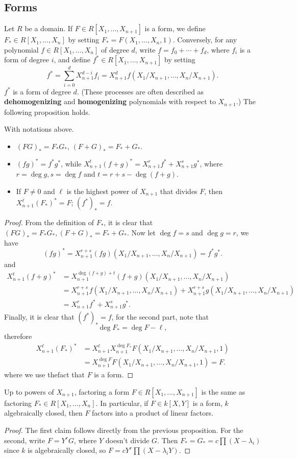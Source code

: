 \subsection{Forms}
Let $R$ be a domain. If $F\in R[X_1,\dots,X_{n+1}]$ is a form, we define $F_*\in R[X_1,\dots,X_{n}]$ by setting $F_*=F(X_1,\dots,X_n,1)$. Conversely, for any polynomial $f\in R[X_1,\dots,X_n]$ of degree $d$, write $f=f_0+\cdots+f_d$, where $f_i$ is a form of degree $i$, and define $f^*\in R[X_1,\dots,X_{n+1}]$ by setting
\[f^*=\sum_{i=0}^{d}X_{n+1}^{d-i}f_{i}=X_{n+1}^df(X_1/X_{n+1},\dots,X_n/X_{n+1}).\]
$f^*$ is a form of degree $d$. (These processes are often described as \textbf{dehomogenizing} and \textbf{homogenizing} polynomials with respect to $X_{n+1}$.) The following proposition holds.
\begin{proposition}\label{homogenousing}
With notations above.
\begin{itemize}
\item $(FG)_*=F_*G_*$, $(F+G)_*=F_*+G_*$.
\item $(fg)^*=f^*g^*$, while $X_{n+1}^t(f+g)^*=X_{n+1}^rf^*+X_{n+1}^sg^*$, where $r=\deg g,s=\deg f$ and $t=r+s-\deg(f+g)$.
\item If $F\neq 0$ and $\ell$ is the highest power of $X_{n+1}$ that divides $F$, then $X_{n+1}^\ell(F_*)^*=F$; $(f^*)_*=f$.
\end{itemize}
\end{proposition}
\begin{proof}
From the definition of $F_*$, it is clear that $(FG)_*=F_*G_*,(F+G)_*=F_*+G_*$. Now let $\deg f=s$ and $\deg g=r$, we have
\[(fg)^*=X_{n+1}^{r+s}(fg)(X_1/X_{n+1},\dots,X_n/X_{n+1})=f^*g^*.\]
and
\begin{align*}
X_{n+1}^t(f+g)^*&=X_{n+1}^{\deg(f+g)+t}(f+g)(X_1/X_{n+1},\dots,X_{n}/X_{n+1})\\
&=X_{n+1}^{r+s}f(X_1/X_{n+1},\dots,X_{n}/X_{n+1})+X_{n+1}^{r+s}g(X_1/X_{n+1},\dots,X_{n}/X_{n+1})\\
&=X_{n+1}^rf^*+X_{n+1}^sg^*.
\end{align*}
Finally, it is clear that $(f^*)_*=f$, for the second part, note that
\[\deg F_*=\deg F-\ell,\]
therefore
\begin{align*}
X_{n+1}^\ell(F_*)^*&=X_{n+1}^\ell X_{n+1}^{\deg F_*}F(X_1/X_{n+1},\dots,X_n/X_{n+1},1)\\
&=X_{n+1}^{\deg F}F(X_1/X_{n+1},\dots,X_n/X_{n+1},1)=F.\end{align*}
where we use thefact that $F$ is a form.
\end{proof}
\begin{corollary}\label{factor k[X,Y]}
Up to powers of $X_{n+1}$, factoring a form $F\in R[X_1,\dots,X_{n+1}]$ is the same as factoring $F_*\in R[X_1,\dots,X_n]$. In particular, if $F\in k[X,Y]$ is a form, $k$ algebraically closed, then $F$ factors into a product of linear factors.
\end{corollary}
\begin{proof}
The first claim follows directly from the previous proposition. For the
second, write $F=Y^rG$, where $Y$ doesn't divide $G$. Then $F_*=G_*=c\prod(X-\lambda_i)$ since $k$ is algebraically closed, so $F=cY^r\prod(X-\lambda_i Y)$.
\end{proof}
